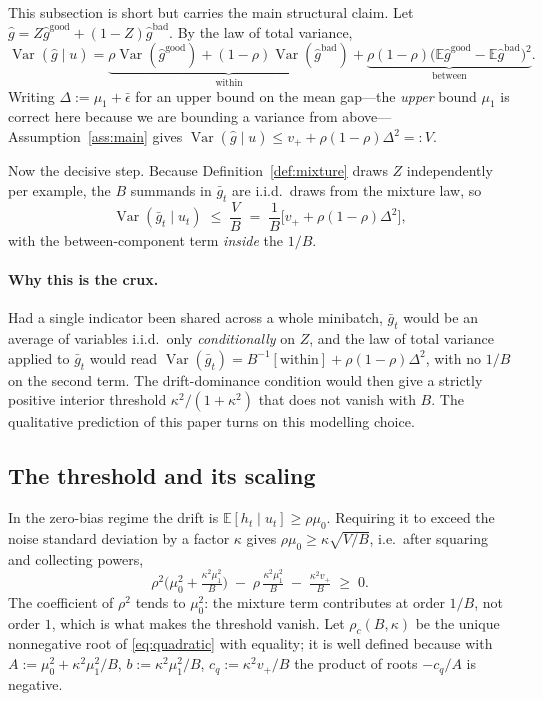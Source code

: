 \documentclass{article}
\theoremstyle{plain}
\theoremstyle{definition}
\theoremstyle{remark}
\newcommand{\E}{\mathbb{E}}
\newcommand{\Var}{\operatorname{Var}}
\newcommand{\1}{\mathbf{1}}
\newcommand{\good}{\mathrm{good}}
\newcommand{\bad}{\mathrm{bad}}
\begin{document}
This subsection is short but carries the main structural claim. Let
$\hat g = Z\hat g^{\good} + (1-Z)\hat g^{\bad}$. By the law of total variance,
\begin{equation}
\label{eq:totalvar}
\Var(\hat g\mid u)
= \underbrace{\rho\Var(\hat g^{\good}) + (1-\rho)\Var(\hat g^{\bad})}_{\text{within}}
+ \underbrace{\rho(1-\rho)\big(\E\hat g^{\good}-\E\hat g^{\bad}\big)^2}_{\text{between}} .
\end{equation}
Writing $\Delta := \mu_1 + \bar\epsilon$ for an upper bound on the mean gap---the
\emph{upper} bound $\mu_1$ is correct here because we are bounding a variance
from above---Assumption~\ref{ass:main} gives
$\Var(\hat g\mid u)\le v_+ + \rho(1-\rho)\Delta^2 =: V$.

Now the decisive step. Because Definition~\ref{def:mixture} draws $Z$
independently per example, the $B$ summands in $\bar g_t$ are i.i.d.\ draws from
the mixture law, so
\begin{equation}
\label{eq:batchvar}
\Var(\bar g_t\mid u_t) \;\le\; \frac{V}{B}
\;=\;\frac1B\Big[v_+ + \rho(1-\rho)\Delta^2\Big],
\end{equation}
with the between-component term \emph{inside} the $1/B$.

\paragraph{Why this is the crux.}
Had a single indicator been shared across a whole minibatch, $\bar g_t$ would be
an average of variables i.i.d.\ only \emph{conditionally} on $Z$, and the law of
total variance applied to $\bar g_t$ would read
$\Var(\bar g_t) = B^{-1}[\text{within}] + \rho(1-\rho)\Delta^2$, with no $1/B$ on
the second term. The drift-dominance condition would then give a strictly
positive interior threshold $\kappa^2/(1+\kappa^2)$ that does not vanish with
$B$. The qualitative prediction of this paper turns on this modelling choice.

\subsection{The threshold and its scaling}

In the zero-bias regime the drift is $\E[h_t\mid u_t]\ge\rho\mu_0$. Requiring it
to exceed the noise standard deviation by a factor $\kappa$ gives
$\rho\mu_0 \ge \kappa\sqrt{V/B}$, i.e.\ after squaring and collecting powers,
\begin{equation}
\label{eq:quadratic}
\rho^2\Big(\mu_0^2 + \tfrac{\kappa^2\mu_1^2}{B}\Big)
\;-\; \rho\,\tfrac{\kappa^2\mu_1^2}{B}
\;-\; \tfrac{\kappa^2 v_+}{B} \;\ge\; 0 .
\end{equation}
The coefficient of $\rho^2$ tends to $\mu_0^2$: the mixture term contributes at
order $1/B$, not order $1$, which is what makes the threshold vanish. Let
$\rho_c(B,\kappa)$ be the unique nonnegative root of \eqref{eq:quadratic} with
equality; it is well defined because with
$A := \mu_0^2+\kappa^2\mu_1^2/B$, $b := \kappa^2\mu_1^2/B$,
$c_q := \kappa^2v_+/B$ the product of roots $-c_q/A$ is negative.
\end{document}
